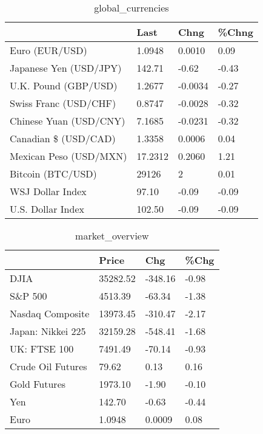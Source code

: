 \documentclass{article}%
\begin{document}
%


\begin{table}[htbp]%
\caption{global\_currencies}%
\centering%
\begin{adjustbox}{width=1\textwidth}%
\begin{tabular}{llll}
\toprule
                       &    Last &    Chng & \%Chng \\
\midrule
        Euro (EUR/USD) &  1.0948 &  0.0010 &  0.09 \\
Japanese Yen (USD/JPY) &  142.71 &   -0.62 & -0.43 \\
  U.K. Pound (GBP/USD) &  1.2677 & -0.0034 & -0.27 \\
 Swiss Franc (USD/CHF) &  0.8747 & -0.0028 & -0.32 \\
Chinese Yuan (USD/CNY) &  7.1685 & -0.0231 & -0.32 \\
  Canadian \$ (USD/CAD) &  1.3358 &  0.0006 &  0.04 \\
Mexican Peso (USD/MXN) & 17.2312 &  0.2060 &  1.21 \\
     Bitcoin (BTC/USD) &   29126 &       2 &  0.01 \\
      WSJ Dollar Index &   97.10 &   -0.09 & -0.09 \\
     U.S. Dollar Index &  102.50 &   -0.09 & -0.09 \\
\bottomrule
\end{tabular}
%
\end{adjustbox}%
\end{table}

%


\begin{table}[htbp]%
\caption{market\_overview}%
\centering%
\begin{adjustbox}{width=1\textwidth}%
\begin{tabular}{llll}
\toprule
                  &    Price &     Chg &  \%Chg \\
\midrule
             DJIA & 35282.52 & -348.16 & -0.98 \\
          S\&P 500 &  4513.39 &  -63.34 & -1.38 \\
 Nasdaq Composite & 13973.45 & -310.47 & -2.17 \\
Japan: Nikkei 225 & 32159.28 & -548.41 & -1.68 \\
     UK: FTSE 100 &  7491.49 &  -70.14 & -0.93 \\
Crude Oil Futures &    79.62 &    0.13 &  0.16 \\
     Gold Futures &  1973.10 &   -1.90 & -0.10 \\
              Yen &   142.70 &   -0.63 & -0.44 \\
             Euro &   1.0948 &  0.0009 &  0.08 \\
\bottomrule
\end{tabular}
%
\end{adjustbox}%
\end{table}

%
\end{document}

